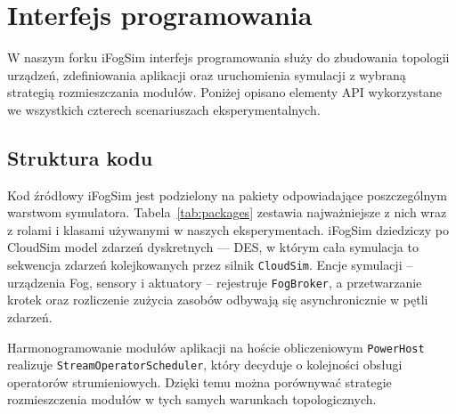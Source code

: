\documentclass[
    oneside,            %
    left=2.5cm,         %
    right=2.5cm,        %
    top=2.5cm,          %
    bottom=3cm,         %
    bindingoffset=6mm,  %
    nohyphenation=false %
]{eiti/eiti-report}
\begin{document}
\section{Interfejs programowania}
W naszym forku iFogSim interfejs programowania służy do zbudowania topologii urządzeń, zdefiniowania aplikacji oraz uruchomienia symulacji z wybraną strategią rozmieszczania modułów. Poniżej opisano elementy API wykorzystane we wszystkich czterech scenariuszach eksperymentalnych.

\subsection{Struktura kodu}
Kod źródłowy iFogSim jest podzielony na pakiety odpowiadające poszczególnym warstwom symulatora. Tabela~\ref{tab:packages} zestawia najważniejsze z nich wraz z rolami i klasami używanymi w naszych eksperymentach.
iFogSim dziedziczy po CloudSim model zdarzeń dyskretnych — DES, w którym cała symulacja to sekwencja zdarzeń kolejkowanych przez silnik \texttt{CloudSim}. Encje symulacji – urządzenia Fog, sensory i aktuatory – rejestruje \texttt{FogBroker}, a przetwarzanie krotek oraz rozliczenie zużycia zasobów odbywają się asynchronicznie w pętli zdarzeń.

Harmonogramowanie modułów aplikacji na hoście obliczeniowym \texttt{PowerHost} realizuje \texttt{Stream\-Operator\-Scheduler}, który decyduje o kolejności obsługi operatorów strumieniowych. Dzięki temu można porównywać strategie rozmieszczenia modułów w tych samych warunkach topologicznych.
\end{document}
